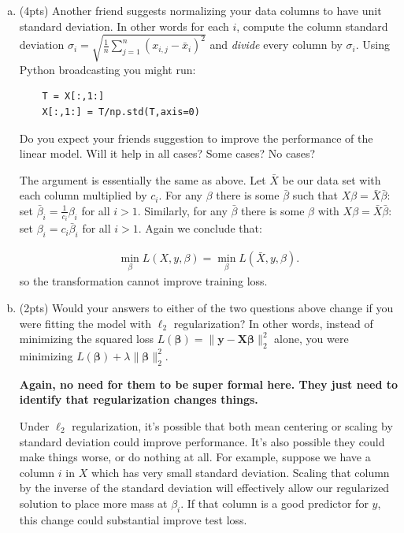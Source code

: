 \documentclass[10pt]{article}
\newcommand{\bs}[1]{\boldsymbol{#1}}
\newcommand{\bv}[1]{\mathbf{#1}}
\begin{document}
\begin{enumerate}[(a)]
	\item (4pts)  Another friend suggests normalizing your data columns to have unit standard deviation. In other words for each $i$, compute the column standard deviation $\sigma_i = \sqrt{\frac{1}{n}\sum_{j=1}^n (x_{i,j} - \bar{x}_i)^2}$ and \emph{divide} every column by $\sigma_i$. 
	Using Python broadcasting you might run:
	\begin{lstlisting}
	T = X[:,1:]
	X[:,1:] = T/np.std(T,axis=0)
	\end{lstlisting}
	Do you expect your friends suggestion to improve the performance of the linear model. Will it help in all cases? Some cases? No cases?
	
	\color{blue}
	The argument is essentially the same as above. Let $\bar{X}$ be our data set with each column multiplied by $c_i$. For 
	any $\beta$ there is some $\bar{\beta}$ such that $X\beta = \bar{X}\bar{\beta}$: set 
	$\bar{\beta}_i = \frac{1}{c_i}\beta_i$ for all $i > 1$. 
	Similarly, for any $\bar{\beta}$ there is some $\beta$ with 
	$X\beta = \bar{X}\bar{\beta}$: 
	set $\beta_i = c_i \bar{\beta}_i$ for all 
	$i > 1$.  Again we conclude that:
	
	\begin{align*}
	\min_\beta L(X,y,\beta) = 	\min_\beta L(\bar{X},y,\beta).
	\end{align*}
	so the transformation cannot improve training loss. 
	
	\color{black}
	
	\item (2pts)  Would your answers to either of the two questions above change if you were fitting the model with $\ell_2$ regularization? In other words, instead of minimizing the squared loss $L(\bs{\beta}) = \|\bv{y} - \bv{X}\bs{\beta}\|_2^2$ alone, you were minimizing $L(\bs{\beta}) + \lambda\|\bs{\beta}\|_2^2$. 
	
	\color{blue}
	\textbf{Again, no need for them to be super formal here. They just need to identify that regularization changes things.}
	
	Under $\ell_2$ regularization, it's possible that both mean centering or scaling by standard deviation could improve performance. It's also possible they could make things worse, or do nothing at all. For example, suppose we have a column $i$ in $X$ which has very small standard deviation. Scaling that column by the inverse of the standard deviation will effectively allow our regularized solution to  place more mass at $\beta_i$. If that column is a good predictor for $y$, this change could substantial improve test loss. 
	\color{black}

\end{enumerate}
\end{document}
